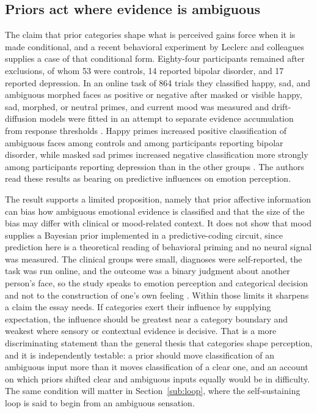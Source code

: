 \documentclass[11pt]{article}
\begin{document}
\subsection{Priors act where evidence is ambiguous}\label{sub:ambiguity}

The claim that prior categories shape what is perceived gains force when it is made conditional, and a recent behavioral experiment by Leclerc and colleagues supplies a case of that conditional form. Eighty-four participants remained after exclusions, of whom 53 were controls, 14 reported bipolar disorder, and 17 reported depression. In an online task of 864 trials they classified happy, sad, and ambiguous morphed faces as positive or negative after masked or visible happy, sad, morphed, or neutral primes, and current mood was measured and drift-diffusion models were fitted in an attempt to separate evidence accumulation from response thresholds \citep{Leclerc2026}. Happy primes increased positive classification of ambiguous faces among controls and among participants reporting bipolar disorder, while masked sad primes increased negative classification more strongly among participants reporting depression than in the other groups \citep{Leclerc2026}. The authors read these results as bearing on predictive influences on emotion perception.

The result supports a limited proposition, namely that prior affective information can bias how ambiguous emotional evidence is classified and that the size of the bias may differ with clinical or mood-related context. It does not show that mood supplies a Bayesian prior implemented in a predictive-coding circuit, since prediction here is a theoretical reading of behavioral priming and no neural signal was measured. The clinical groups were small, diagnoses were self-reported, the task was run online, and the outcome was a binary judgment about another person's face, so the study speaks to emotion perception and categorical decision and not to the construction of one's own feeling \citep{Leclerc2026}. Within those limits it sharpens a claim the essay needs. If categories exert their influence by supplying expectation, the influence should be greatest near a category boundary and weakest where sensory or contextual evidence is decisive. That is a more discriminating statement than the general thesis that categories shape perception, and it is independently testable: a prior should move classification of an ambiguous input more than it moves classification of a clear one, and an account on which priors shifted clear and ambiguous inputs equally would be in difficulty. The same condition will matter in Section~\ref{sub:loop}, where the self-sustaining loop is said to begin from an ambiguous sensation.
\end{document}

